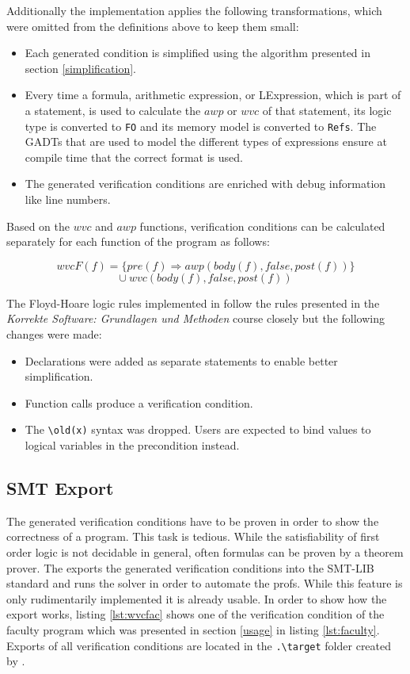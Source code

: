 \documentclass[12pt]{article}
\begin{document}
Additionally the implementation applies the following transformations, which were omitted from the definitions above to keep them small:

\begin{itemize}
    \item Each generated condition is simplified using the algorithm presented in section \ref{simplification}.
    \item Every time a formula, arithmetic expression, or LExpression, which is part of a statement, is used to calculate the $awp$ or $wvc$ of that statement, its logic type is converted to \texttt{FO} and its memory model is converted to \texttt{Refs}.
    The GADTs that are used to model the different types of expressions ensure at compile time that the correct format is used.
    \item The generated verification conditions are enriched with debug information like line numbers.
\end{itemize}

Based on the $wvc$ and $awp$ functions, verification conditions can be calculated separately for each function of the program as follows:

\[wvcF(f) = \{pre(f)\Rightarrow awp(body(f), false, post(f))\} \]
\[\cup\ wvc(body(f), false, post(f))\]

The Floyd-Hoare logic rules implemented in \verifyc follow the rules presented in the 
\emph{Korrekte Software: Grundlagen und Methoden} course closely but the following changes were made:

\begin{itemize}
    \item Declarations were added as separate statements to enable better simplification.
    \item Function calls produce a verification condition.
    \item The \texttt{\textbackslash old(x)} syntax was dropped. Users are expected to bind values to logical variables in the precondition instead.
\end{itemize}

\subsection{SMT Export}
The generated verification conditions have to be proven in order to show the correctness of a program.
This task is tedious.
While the satisfiability of first order logic is not decidable in general, often formulas can be proven by a theorem prover.
The \verifyc exports the generated verification conditions into the SMT-LIB standard and runs the \zthree solver in order to automate the profs.
While this feature is only rudimentarily implemented it is already usable.
In order to show how the export works, listing \ref{lst:wvcfac} shows one of the verification condition of the faculty program which was presented in section \ref{usage} in listing \ref{lst:faculty}.
Exports of all verification conditions are located in the \texttt{.\textbackslash target} folder created by \verifyc.
\end{document}
